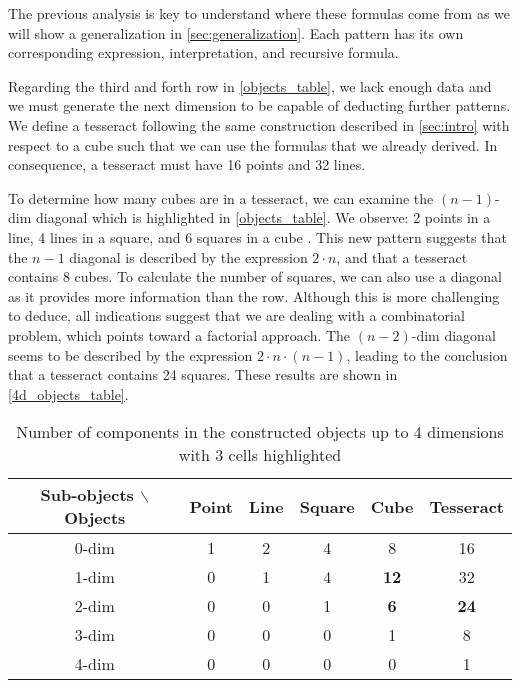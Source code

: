 \documentclass{article}
\begin{document}
	The previous analysis is key to understand where these formulas come from as we will show a generalization in \autoref{sec:generalization}. Each pattern has its own corresponding expression, interpretation, and recursive formula.
	
	Regarding the third and forth row in \autoref{objects_table}, we lack enough data and we must generate the next dimension to be capable of deducting further patterns. We define a tesseract following the same construction described in \autoref{sec:intro} with respect to a cube such that we can use the formulas that we already derived. In consequence, a tesseract must have 16 points and 32 lines.
	
	To determine how many cubes are in a tesseract, we can examine the $(n-1)$-dim diagonal which is highlighted in \autoref{objects_table}. We observe: 2 points in a line, 4 lines in a square, and 6 squares in a cube \cite{coxeter1973regular}. This new pattern suggests that the $n-1$ diagonal is described by the expression $2 \cdot n$, and that a tesseract contains 8 cubes. To calculate the number of squares, we can also use a diagonal as it provides more information than the row. Although this is more challenging to deduce, all indications suggest that we are dealing with a combinatorial problem, which points toward a factorial approach. The $(n-2)$-dim diagonal seems to be described by the expression $2 \cdot n \cdot (n-1)$, leading to the conclusion that a tesseract contains 24 squares. These results are shown in \autoref{4d_objects_table}.
	
	\begin{table}[ht]
		\centering
		\begin{tabular}{||c || c c c c c||}
			\hline
			Sub-objects $\backslash$ Objects & Point & Line & Square & Cube & Tesseract \cite{coxeter1973regular}\\\hline\hline
			0-dim & 1 & 2 & 4 & 8  & 16\\\hline
			1-dim & 0 & 1 & 4 & \textbf{12} & 32\\\hline
			2-dim & 0 & 0 & 1 & \textbf{6}  & \textbf{24}\\\hline
			3-dim & 0 & 0 & 0 & 1  & 8 \\\hline
			4-dim & 0 & 0 & 0 & 0  & 1\\\hline
		\end{tabular}
		\caption{Number of components in the constructed objects up to 4 dimensions with 3 cells highlighted}
		\label{4d_objects_table}
	\end{table}
	
\end{document}
